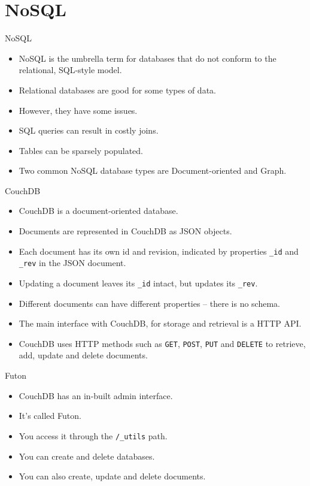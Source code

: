 \section{NoSQL}

\begin{frame}{NoSQL}
	\begin{itemize}
		\item NoSQL is the umbrella term for databases that do not conform to the relational, SQL-style model.
		\item Relational databases are good for some types of data.
		\item However, they have some issues.
		\item SQL queries can result in costly joins.
		\item Tables can be sparsely populated.
		\item Two common NoSQL database types are Document-oriented and Graph.
		
	\end{itemize}
\end{frame}

\begin{frame}{CouchDB}
	\begin{itemize}
		\item CouchDB is a document-oriented database.
		\item Documents are represented in CouchDB as JSON objects.
		\item Each document has its own id and revision, indicated by properties \texttt{_id} and \texttt{_rev} in the JSON document.
		\item Updating a document leaves its \texttt{_id} intact, but updates its \texttt{_rev}.
		\item Different documents can have different properties -- there is no schema.
		\item The main interface with CouchDB, for storage and retrieval is a HTTP API.
		\item CouchDB uses HTTP methods such as \texttt{GET}, \texttt{POST}, \texttt{PUT} and \texttt{DELETE} to retrieve, add, update and delete documents.
	\end{itemize}
\end{frame}

\begin{frame}{Futon}
	\begin{itemize}
		\item CouchDB has an in-built admin interface.
		\item It's called Futon.
		\item You access it through the \texttt{/_utils} path.
		\item You can create and delete databases.
		\item You can also create, update and delete documents.
	\end{itemize}
\end{frame}


